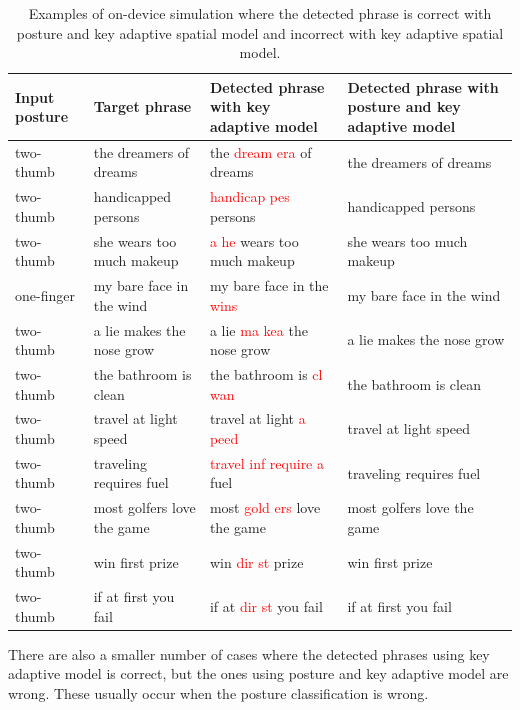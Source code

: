 \documentclass{sigchi}
\newcommand\tabhead[1]{\small\textbf{#1}}
\begin{document}
\begin{table}[tb]
  \centering
  \begin{tabularx}{0.925\textwidth}{|l|l|l|l|}
  \hline
  \tabhead{Input posture} & \tabhead{Target phrase} & \tabhead{Detected phrase with key adaptive model} 
  & \multicolumn{1}{|p{0.526\columnwidth}|}{\tabhead{Detected phrase with posture and key adaptive model}}\\
  \hline
  two-thumb & the dreamers of dreams & the \textcolor{red}{dream era} of dreams & the dreamers of dreams  \\
  \hline
  two-thumb & handicapped persons & \textcolor{red}{handicap pes} persons & handicapped persons \\
  \hline
  two-thumb & she wears too much makeup & \textcolor{red}{a he} wears too much makeup & she wears too much makeup \\
  \hline
  one-finger & my bare face in the wind & my bare face in the \textcolor{red}{wins} & my bare face in the wind \\ 
  \hline
  two-thumb & a lie makes the nose grow & a lie \textcolor{red}{ma kea} the nose grow & a lie makes the nose grow \\
  \hline 
  two-thumb & the bathroom is clean & the bathroom is \textcolor{red}{cl wan} & the bathroom is clean \\
  \hline 
  two-thumb & travel at light speed & travel at light \textcolor{red}{a peed} & travel at light speed \\ 
  \hline
  two-thumb & traveling requires fuel & \textcolor{red}{travel inf require a} fuel & traveling requires fuel \\
  \hline 
  two-thumb & most golfers love the game & most \textcolor{red}{gold ers} love the game & most golfers love the game \\ 
  \hline
  two-thumb & win first prize & win \textcolor{red}{dir st} prize & win first prize \\ 
  \hline
  two-thumb & if at first you fail & if at \textcolor{red}{dir st} you fail & if at first you fail \\ 
  \hline
  \end{tabularx}
  \caption{Examples of on-device simulation where the detected phrase is correct
  with posture and key adaptive spatial model and incorrect with key adaptive spatial
  model.}
  \label{tab:on-device}
\end{table}

There are also a smaller number of cases where the detected phrases using key 
adaptive model is correct, but the ones using posture and key adaptive model are
wrong. These usually occur when the posture classification is wrong. 
\end{document}
